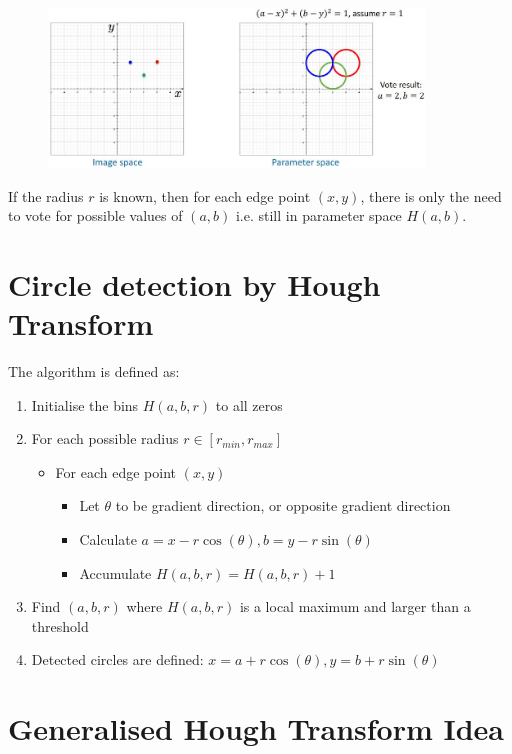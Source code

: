 \documentclass{report}
\begin{document}
\pagebreak

\begin{figure}[h]
    \centering
    \includegraphics[width=10cm]{Circle.JPG}
\end{figure}

If the radius $r$ is known, then for each edge point $(x,y)$, there is only the
need to vote for possible values of $(a,b)$ i.e. still in parameter space $H(a,b)$. 

\section{Circle detection by Hough Transform}

The algorithm is defined as:
\begin{enumerate}
    \item Initialise the bins $H(a, b, r)$ to all zeros
    \item For each possible radius $r \in [r_{min}, r_{max}]$
    \begin{itemize}
        \item For each edge point $(x, y)$
        \begin{itemize}
            \item Let $\theta$ to be gradient direction, or opposite gradient direction
            \item Calculate $a = x - r\cos(\theta), b = y - r\sin(\theta)$
            \item Accumulate $H(a,b,r) = H(a,b,r) + 1$
        \end{itemize}
    \end{itemize}
    \item Find $(a,b,r)$ where $H(a,b,r)$ is a local maximum and larger than a threshold
    \item Detected circles are defined: $x = a + r\cos(\theta), y = b + r\sin(\theta)$
\end{enumerate}

\section{Generalised Hough Transform Idea}
\end{document}
